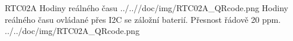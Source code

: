 \uvod
{RTC02A}
{Hodiny reálného času}
{}
{../..//doc/img/RTC02A_QRcode.png}
{Hodiny reálného času ovládané přes I2C se záložní baterií. Přesnost řádově 20 ppm. }
{ }
{../../doc/img/RTC02A_QRcode.png}